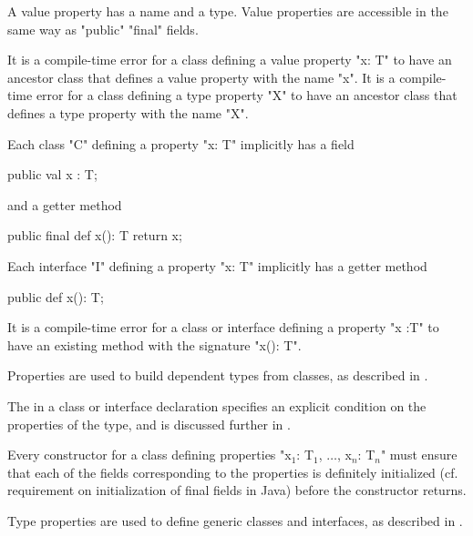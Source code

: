 A value property has a name and a type.   Value properties
are accessible in the same way as \xcd"public" \xcd"final"
fields.

\begin{staticrule*}
It is a compile-time error for a class
defining a value property \xcd"x: T" to have an ancestor class that defines
a value property with the name \xcd"x".  
It is a compile-time error for a class
defining a type property \xcd"X" to have an ancestor class that defines
a type property with the name \xcd"X".   
\end{staticrule*}

Each class \xcd"C" defining a property \xcd"x: T" implicitly has a field

\begin{xten}
public val x : T;
\end{xten} 

\noindent and a getter method

\begin{xten}
public final def x(): T { return x; }
\end{xten}

\noindent Each interface \xcd"I" defining a property \xcd"x: T"
implicitly has a getter method

\begin{xten}
public def x(): T;
\end{xten}

\begin{staticrule*}
It is a compile-time error for a class or
interface defining a property \xcd"x :T" to have an existing method with
the signature \xcd"x(): T".
\end{staticrule*}

Properties are used to build dependent types from classes, as
described in .

The  in a class or interface declaration specifies an
explicit condition on the properties of the type, and is discussed further
in .

\begin{staticrule*}
     Every constructor for a class defining
   properties \xcdmath"x$_1$: T$_1$, $\ldots$, x$_n$: T$_n$" must ensure that each of the fields
   corresponding to the properties is definitely initialized
   (cf. requirement on initialization of final fields in Java) before the
   constructor returns.
\end{staticrule*}

Type properties are used to define generic classes and
interfaces, as described in .


